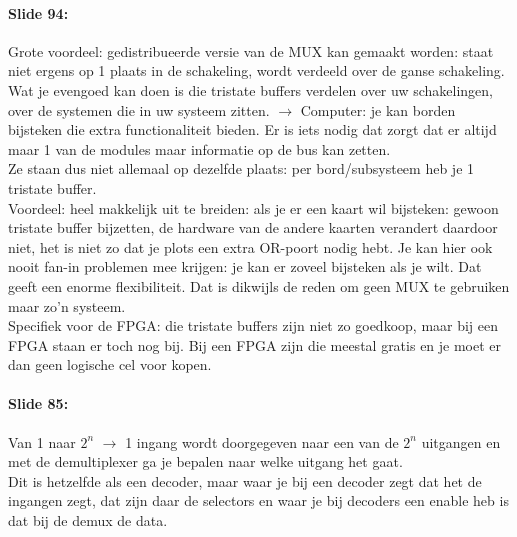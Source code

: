 \documentclass[10pt,a4paper]{book}
\begin{document}
\paragraph{Slide 94:} Grote voordeel: gedistribueerde versie van de MUX kan gemaakt worden: staat niet ergens op 1 plaats in de schakeling, wordt verdeeld over de ganse schakeling. Wat je evengoed kan doen is die tristate buffers verdelen over uw schakelingen, over de systemen die in uw systeem zitten. $\rightarrow$ Computer: je kan borden bijsteken die extra functionaliteit bieden. Er is iets nodig dat zorgt dat er altijd maar 1 van de modules maar informatie op de bus kan zetten.\\
Ze staan dus niet allemaal op dezelfde plaats: per bord/subsysteem heb je 1 tristate buffer.\\
Voordeel: heel makkelijk uit te breiden: als je er een kaart wil bijsteken: gewoon tristate buffer bijzetten, de hardware van de andere kaarten verandert daardoor niet, het is niet zo dat je plots een extra OR-poort nodig hebt. Je kan hier ook nooit fan-in problemen mee krijgen: je kan er zoveel bijsteken als je wilt. Dat geeft een enorme flexibiliteit. Dat is dikwijls de reden om geen MUX te gebruiken maar zo'n systeem.\\
Specifiek voor de FPGA: die tristate buffers zijn niet zo goedkoop, maar bij een FPGA staan er toch nog bij. Bij een FPGA zijn die meestal gratis en je moet er dan geen logische cel voor kopen.

\paragraph{Slide 85:} Van 1 naar $2^n$ $\rightarrow$ 1 ingang wordt doorgegeven naar een van de $2^n$ uitgangen en met de demultiplexer ga je bepalen naar welke uitgang het gaat.\\
Dit is hetzelfde als een decoder, maar waar je bij een decoder zegt dat het de ingangen zegt, dat zijn daar de selectors en waar je bij decoders een enable heb is dat bij de demux de data.
\end{document}
